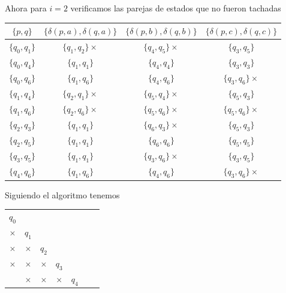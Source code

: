 \begin{itemize}
            Ahora para $i=2$ verificamos las parejas de estados que no fueron tachadas

            \begin{center}
                \begin{tabular}{c||c|c|c}
                  $\{p,q\}$ & $\{\delta(p,a),\delta(q,a)\}$ & $\{\delta(p,b),\delta(q,b)\}$ & $\{\delta(p,c),\delta(q,c)\}$\\ \hline
                  $\{q_0,q_1\}$ & $\{q_1,q_2\}\times$ & $\{q_4,q_5\}\times$ & $\{q_3,q_5\}$ \\ \hline
                  $\{q_0,q_4\}$ & $\{q_1,q_1\}$ & $\{q_4,q_4\}$ & $\{q_3,q_3\}$ \\ \hline
                  $\{q_0,q_6\}$ & $\{q_1,q_6\}$ & $\{q_4,q_6\}$ & $\{q_3,q_6\}\times$ \\ \hline
                  $\{q_1,q_4\}$ & $\{q_2,q_1\}\times$ & $\{q_5,q_4\}\times$ & $\{q_5,q_3\}$ \\ \hline
                  $\{q_1,q_6\}$ & $\{q_2,q_6\}\times$ & $\{q_5,q_6\}\times$ & $\{q_5,q_6\}\times$ \\ \hline
                  $\{q_2,q_3\}$ & $\{q_1,q_1\}$ & $\{q_6,q_3\}\times$ & $\{q_5,q_3\}$ \\ \hline
                  $\{q_2,q_5\}$ & $\{q_1,q_1\}$ & $\{q_6,q_6\}$ & $\{q_5,q_5\}$ \\ \hline
                  $\{q_3,q_5\}$ & $\{q_1,q_1\}$ & $\{q_3,q_6\}\times$ & $\{q_3,q_5\}$ \\ \hline
                  $\{q_4,q_6\}$ & $\{q_1,q_6\}$ & $\{q_4,q_6\}$ & $\{q_3,q_6\}\times$ \\ \hline
                \end{tabular}
            \end{center}
            Siguiendo el algoritmo tenemos
            \begin{center}
                \begin{tabular}{ccccccc}
                 $q_0$ \\ \cline{1-1}
                 \multicolumn{1}{|c|}{$\times$} & $q_1$ \\ \cline{1-2}
                 \multicolumn{1}{|c|}{$\times$} & \multicolumn{1}{|c|}{$\times$} & $q_2$ \\ \cline{1-3}
                 \multicolumn{1}{|c|}{$\times$} & \multicolumn{1}{|c|}{$\times$} & \multicolumn{1}{|c|}{$\times$} & $q_3$ \\ \cline{1-4}
                 \multicolumn{1}{|c|}{} & \multicolumn{1}{|c|}{$\times$} & \multicolumn{1}{|c|}{$\times$} & \multicolumn{1}{|c|}{$\times$} & $q_4$ \\ \cline{1-5}

\end{tabular}
\end{center}
\end{itemize}
